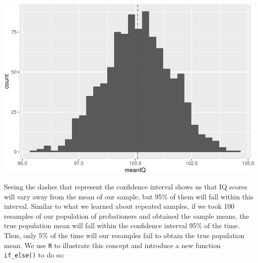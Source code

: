 \documentclass[
]{book}
\begin{document}
\includegraphics{05-inferential-statistics_files/figure-latex/unnamed-chunk-13-1.pdf}

Seeing the dashes that represent the confidence interval shows us that IQ scores will vary away from the mean of our sample, but 95\% of them will fall within this interval. Similar to what we learned about repeated samples, if we took 100 resamples of our population of probationers and obtained the sample means, the true population mean will fall within the confidence interval 95\% of the time. Thus, only 5\% of the time will our resamples fail to obtain the true population mean. We use \texttt{R} to illustrate this concept and introduce a new function \texttt{if\_else()} to do so:
\end{document}
